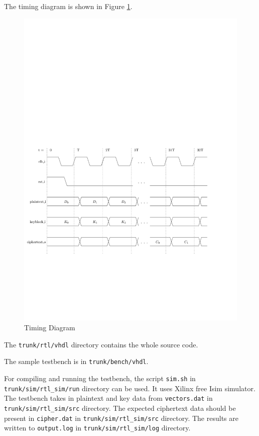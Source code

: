 \documentclass[a4paper]{article}
\begin{document}
The timing diagram is shown in Figure \ref{clock}.
\begin{figure}[H]
\centering
\includegraphics[scale=0.7]{clock}
\caption{Timing Diagram}
\label{clock}
\end{figure}

The \texttt{trunk/rtl/vhdl} directory contains the whole source code.

The sample testbench is in \texttt{trunk/bench/vhdl}.

For compiling and running the testbench, the script \texttt{sim.sh} in \texttt{trunk/sim/rtl\_sim/run} directory can be used. It uses Xilinx free Isim simulator. The testbench takes in plaintext and key data from \texttt{vectors.dat} in \texttt{trunk/sim/rtl\_sim/src} directory. The expected ciphertext data should be present in \texttt{cipher.dat} in \texttt{trunk/sim/rtl\_sim/src} directory. The results are written to \texttt{output.log} in \texttt{trunk/sim/rtl\_sim/log} directory. 
\end{document}
